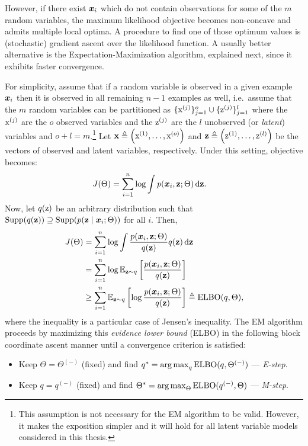 However, if there exist ${\bm{x}}_i$ which do not contain observations for some of the $m$ random variables, the maximum likelihood objective becomes non-concave and admits multiple local optima. A procedure to find one of those optimum values is (stochastic) gradient ascent over the likelihood function. A usually better alternative is the Expectation-Maximization algorithm, explained next, since it exhibits faster convergence.

For simplicity, assume that if a random variable is observed in a given example ${\bm{x}}_i$ then it is observed in all remaining $n-1$ examples as well, i.e.\ assume that the $m$ random variables can be partitioned as $\lbrace {\textnormal{x}}^{(j)} \rbrace_{j=1}^o \cup \lbrace {\textnormal{z}}^{(j)} \rbrace_{j=1}^l$ where the ${\textnormal{x}}^{(j)}$ are the $o$ observed variables and the ${\textnormal{z}}^{(j)}$ are the $l$ unobserved (or \emph{latent}) variables and $o+l=m$.\footnote{This assumption is not necessary for the EM algorithm to be valid. However, it makes the exposition simpler and it will hold for all latent variable models considered in this thesis.} Let ${\mathbf{x}} \triangleq \left({\textnormal{x}}^{(1)}, \dots, {\textnormal{x}}^{(o)} \right)$ and ${\mathbf{z}} \triangleq \left({\textnormal{z}}^{(1)}, \dots, {\textnormal{z}}^{(l)} \right)$ be the vectors of observed and latent variables, respectively. Under this setting, objective  becomes:
\begin{align}
    J(\Theta) &= \sum_{i=1}^n \log \int p({\bm{x}}_i, {\mathbf{z}}; \Theta) {\,\text{d}} {\mathbf{z}}.
\end{align}
Now, let $q({\textnormal{z}})$ be an arbitrary distribution such that $\mathrm{Supp}(q({\mathbf{z}})) \supseteq \mathrm{Supp}(p({\mathbf{z}} \mid {\bm{x}}_i; \Theta))$ for all $i$. Then,
\begingroup
\allowdisplaybreaks
\begin{align}
    J(\Theta) &= \sum_{i=1}^n \log \int \frac{p({\bm{x}}_i, {\mathbf{z}}; \Theta)}{q({\mathbf{z}})} q({\mathbf{z}}) {\,\text{d}} {\mathbf{z}} \nonumber\\
    &= \sum_{i=1}^n \log \mathbb{E}_{{\mathbf{z}} \sim q} \left[ \frac{p({\bm{x}}_i, {\mathbf{z}}; \Theta)} {q({\mathbf{z}})} \right] \nonumber\\
    &\geq \sum_{i=1}^n \mathbb{E}_{{\mathbf{z}} \sim q} \left[ \log  \frac{p({\bm{x}}_i, {\mathbf{z}}; \Theta)}{q({\mathbf{z}})} \right] \triangleq \mathrm{ELBO}(q,\Theta),
\end{align}
\endgroup
where the inequality is a particular case of Jensen's inequality. The EM algorithm proceeds by maximizing this \emph{evidence lower bound} (ELBO) in the following block coordinate ascent manner until a convergence criterion is satisfied:
\begin{itemize}
    \item Keep $\Theta = \Theta^{(-)}$ (fixed) and find $q^* = \operatorname*{arg\,max}_q \mathrm{ELBO}(q, \Theta^{(-)})$ --- \emph{E-step}.
    \item Keep $q = q^{(-)}$ (fixed) and find $\Theta^* = \operatorname*{arg\,max}_\Theta \mathrm{ELBO}(q^{(-)}, \Theta)$ --- \emph{M-step}.
\end{itemize}

